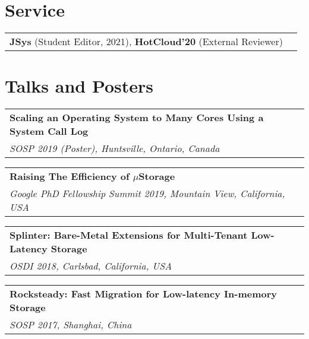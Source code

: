 \documentclass[margin,line]{res}
\begin{document}
\begin{resume}

\section{\sc Service}
\begin{tabular}{@{}p{5.5in}p{4in}}
{\bf JSys} {\small (Student Editor, 2021)}, {\bf HotCloud'20} {\small
(External Reviewer)}\\
\end{tabular}

\section{\sc Talks and Posters}
\begin{tabular}{@{}p{5.5in}p{4in}}
{\bf Scaling an Operating System to Many Cores Using a System Call Log}\\
{\small\em SOSP 2019 (Poster), Huntsville, Ontario, Canada}\\
\end{tabular}

\vspace{-7pt}
\begin{tabular}{@{}p{5.5in}p{4in}}
{\bf Raising The Efficiency of $\mu$Storage}\\
{\small\em Google PhD Fellowship Summit 2019, Mountain View, California,
USA}\\
\end{tabular}

\vspace{-7pt}
\begin{tabular}{@{}p{5.5in}p{4in}}
{\bf Splinter: Bare-Metal Extensions for Multi-Tenant Low-Latency Storage}\\
{\small\em OSDI 2018, Carlsbad, California, USA}\\
\end{tabular}

\vspace{-7pt}
\begin{tabular}{@{}p{5.5in}p{4in}}
{\bf Rocksteady: Fast Migration for Low-latency In-memory Storage}\\
{\small\em SOSP 2017, Shanghai, China}\\
\end{tabular}


\end{resume}
\end{document}
